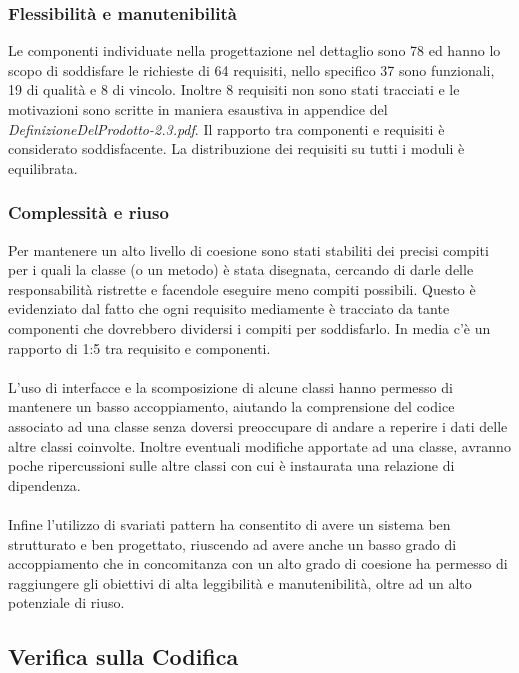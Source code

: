\subsubsection*{Flessibilit\`a e manutenibilit\`a} Le componenti individuate
nella progettazione nel dettaglio sono 78 ed hanno lo scopo di soddisfare le
richieste di 64 requisiti, nello specifico 37 sono funzionali, 19 di qualit\`a e
8 di vincolo. Inoltre 8 requisiti non sono stati tracciati e le motivazioni sono
scritte in maniera esaustiva in appendice del
\emph{DefinizioneDelProdotto-2.3.pdf}. Il rapporto tra componenti e requisiti
\`e considerato soddisfacente. La distribuzione dei requisiti su tutti i moduli
\`e equilibrata.

\subsubsection*{Complessit\`a e riuso}
Per mantenere un alto livello di coesione sono stati stabiliti dei precisi
compiti per i quali la classe (o un metodo) \`e stata disegnata, cercando di
darle delle responsabilit\`a ristrette e facendole eseguire meno compiti
possibili. Questo \`e evidenziato dal fatto che ogni requisito mediamente \`e
tracciato da tante componenti che dovrebbero dividersi i compiti per
soddisfarlo. In media c'\`e un rapporto di 1:5 tra requisito e componenti. \\\\
L'uso di interfacce e la scomposizione di alcune classi hanno permesso di
mantenere un basso accoppiamento, aiutando la comprensione del codice associato
ad una classe senza doversi preoccupare di andare a reperire i dati delle altre
classi coinvolte. Inoltre eventuali modifiche apportate ad una classe, avranno
poche ripercussioni sulle altre classi con cui \`e instaurata una relazione di
dipendenza. \\\\
Infine l'utilizzo di svariati pattern ha consentito di avere un sistema ben
strutturato e ben progettato, riuscendo ad avere anche un basso grado di
accoppiamento che in concomitanza con un alto grado di coesione ha permesso di
raggiungere gli obiettivi di alta leggibilit\`a e manutenibilit\`a, oltre ad un
alto potenziale di riuso.

\subsection{Verifica sulla Codifica}

